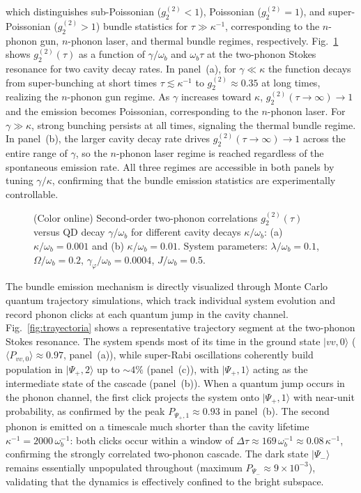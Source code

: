 \documentclass{ws-ijmpb}
\begin{document}
which distinguishes sub-Poissonian ($g_2^{(2)} < 1$), Poissonian ($g_2^{(2)} = 1$), and 
super-Poissonian ($g_2^{(2)} > 1$) bundle statistics for $\tau \gg \kappa^{-1}$, corresponding 
to the $n$-phonon gun, $n$-phonon laser, and thermal bundle regimes, respectively. Fig.~\ref{fig:g2_decay} shows $g_2^{(2)}(\tau)$ as a function of $\gamma/\omega_b$ and 
$\omega_b\tau$ at the two-phonon Stokes resonance for two cavity decay rates. In 
panel~(a), for $\gamma \ll \kappa$ the function decays from super-bunching at short times 
$\tau \lesssim \kappa^{-1}$ to $g_2^{(2)} \approx 0.35$ at long times, realizing the 
$n$-phonon gun regime. As $\gamma$ increases toward $\kappa$, $g_2^{(2)}(\tau\to\infty) \to 1$ 
and the emission becomes Poissonian, corresponding to the $n$-phonon laser. For 
$\gamma \gg \kappa$, strong bunching persists at all times, signaling the thermal bundle regime. 
In panel~(b), the larger cavity decay rate drives $g_2^{(2)}(\tau\to\infty) \to 1$ across the 
entire range of $\gamma$, so the $n$-phonon laser regime is reached regardless of the 
spontaneous emission rate. All three regimes are accessible in both panels by tuning 
$\gamma/\kappa$, confirming that the bundle emission statistics are experimentally controllable.

\begin{figure}[H]
	\centering
	
	\caption{(Color online) Second-order two-phonon correlations $g_2^{(2)}(\tau)$ versus QD decay 
		$\gamma/\omega_b$ for different cavity decays $\kappa/\omega_b$: (a) $\kappa/\omega_b = 
		0.001$ and (b) $\kappa/\omega_b = 0.01$. System parameters: $\lambda/\omega_b = 0.1$, 
		$\Omega/\omega_b = 0.2$, $\gamma_\varphi/\omega_b = 0.0004$, $J/\omega_b = 0.5$.}
	\label{fig:g2_decay}
\end{figure}

The bundle emission mechanism is directly visualized through Monte Carlo quantum trajectory 
simulations, which track individual system evolution and record phonon clicks at each quantum 
jump in the cavity channel. Fig.~\ref{fig:trayectoria} shows a representative trajectory 
segment at the two-phonon Stokes resonance. The system spends most of its time in the ground 
state $|vv,0\rangle$ ($\langle P_{vv,0}\rangle \approx 0.97$, panel~(a)), while super-Rabi 
oscillations coherently build population in $|\Psi_+,2\rangle$ up to $\sim 4\%$ (panel~(c)), 
with $|\Psi_+,1\rangle$ acting as the intermediate state of the cascade (panel~(b)). When a 
quantum jump occurs in the phonon channel, the first click projects the system onto 
$|\Psi_+,1\rangle$ with near-unit probability, as confirmed by the peak 
$P_{\Psi_+,1} \approx 0.93$ in panel~(b). The second phonon is emitted on a timescale much 
shorter than the cavity lifetime $\kappa^{-1} = 2000\,\omega_b^{-1}$: both clicks occur within 
a window of $\Delta\tau \approx 169\,\omega_b^{-1} \approx 0.08\,\kappa^{-1}$, confirming the 
strongly correlated two-phonon cascade. The dark state $|\Psi_-\rangle$ remains essentially 
unpopulated throughout (maximum $P_{\Psi_-} \approx 9\times10^{-3}$), validating that the 
dynamics is effectively confined to the bright subspace.
\end{document}
